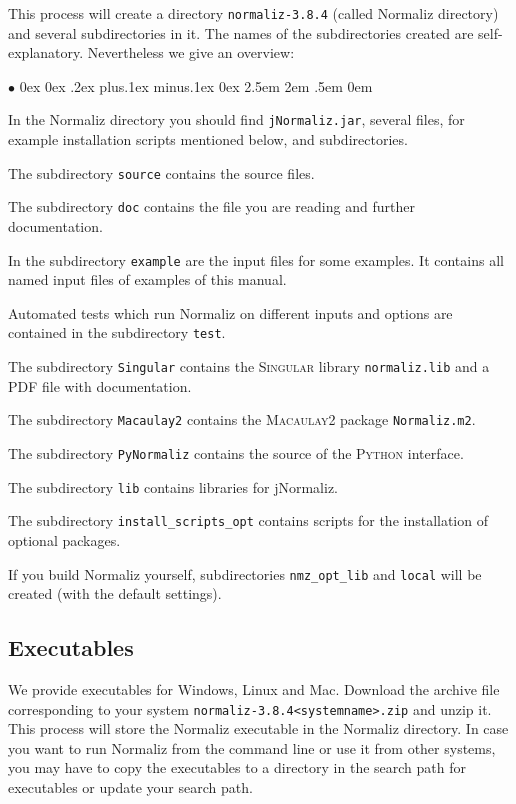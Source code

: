 \documentclass[12pt,a4paper]{scrartcl}
\newcommand{\stdli}{ \topsep0ex \partopsep0ex %
\parsep.2ex plus.1ex minus.1ex \itemsep0ex%
\leftmargin2.5em \labelwidth2em \labelsep.5em \rightmargin0em}%
\renewenvironment{itemize}{\begin{list}{{$\bullet$}}{\stdli}}{\end{list}}
\theoremstyle{definition}
\def\ttt{\texttt}
\def\version{3.8.4}
\def\NmzDir{normaliz-\version}
\begin{document}
This process will create a directory \ttt{\NmzDir} (called
Normaliz directory) and several subdirectories in
it. The names of the subdirectories created are
self-explanatory. Nevertheless we give an overview:
\begin{itemize}
\item In the Normaliz directory you should
find \ttt{jNormaliz.jar}, several files, for example installation scripts mentioned below,  and
subdirectories.

\item The subdirectory \ttt{source} contains the source files.

\item The subdirectory \ttt{doc} contains the file you are reading 
and further documentation.

\item In the subdirectory \ttt{example} are the input
files for some examples. It contains all named
input files of examples of this manual.

\item Automated tests which run Normaliz on different inputs
and options are contained in the subdirectory \ttt{test}.

\item The subdirectory \ttt{Singular} contains the
\textsc{Singular} library \ttt{normaliz.lib} and a PDF file with
documentation.

\item The subdirectory \ttt{Macaulay2} contains the
\textsc{Macaulay2} package \ttt{Normaliz.m2}.

\item The subdirectory \ttt{PyNormaliz} contains the source of the
\textsc{Python} interface.

\item The subdirectory \ttt{lib} contains libraries for
jNormaliz.

\item The subdirectory \verb|install_scripts_opt| contains scripts for the installation of optional packages.
\end{itemize}

If you build Normaliz yourself, subdirectories \verb|nmz_opt_lib| and \verb|local| will be created (with the default settings).

\subsection{Executables}

We provide executables for Windows, Linux and Mac. Download the archive file
corresponding to your system \ttt{\NmzDir<systemname>.zip}
and unzip it. This process will store the Normaliz executable in the Normaliz directory. In case you want to run Normaliz from the
command line or use it from other systems, you may have to copy
the executables to a directory in the search path for
executables or update your search path.
\end{document}
